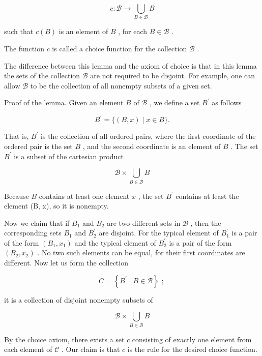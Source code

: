 \[
c : \mathcal{B} \rightarrow  \mathop{\bigcup }\limits_{{B \in  \mathcal{B}}}B
\]

such that \(c\left( B\right)\) is an element of \(B\) , for each \(B \in  \mathcal{B}\) .

The function \(c\) is called a choice function for the collection \(\mathcal{B}\) .

The difference between this lemma and the axiom of choice is that in this lemma the sets of the collection \(\mathcal{B}\) are not required to be disjoint. For example, one can allow \(\mathcal{B}\) to be the collection of all nonempty subsets of a given set.

Proof of the lemma. Given an element \(B\) of \(\mathcal{B}\) , we define a set \({B}^{\prime }\) as follows

\[
{B}^{\prime } = \{ \left( {B,x}\right)  \mid  x \in  B\} .
\]

That is, \({B}^{\prime }\) is the collection of all ordered pairs, where the first coordinate of the ordered pair is the set \(B\) , and the second coordinate is an element of \(B\) . The set \({B}^{\prime }\) is a subset of the cartesian product

\[
\mathcal{B} \times  \mathop{\bigcup }\limits_{{B \in  \mathcal{B}}}B
\]

Because \(B\) contains at least one element \(x\) , the set \({B}^{\prime }\) contains at least the element (B, x), so it is nonempty.

Now we claim that if \({B}_{1}\) and \({B}_{2}\) are two different sets in \(\mathcal{B}\) , then the corresponding sets \({B}_{1}^{\prime }\) and \({B}_{2}^{\prime }\) are disjoint. For the typical element of \({B}_{1}^{\prime }\) is a pair of the form \(\left( {{B}_{1},{x}_{1}}\right)\) and the typical element of \({B}_{2}^{\prime }\) is a pair of the form \(\left( {{B}_{2},{x}_{2}}\right)\) . No two such elements can be equal, for their first coordinates are different. Now let us form the collection

\[
C = \left\{  {{B}^{\prime } \mid  B \in  \mathcal{B}}\right\}  \text{ ; }
\]

it is a collection of disjoint nonempty subsets of

\[
\mathcal{B} \times  \mathop{\bigcup }\limits_{{B \in  \mathcal{B}}}B
\]

By the choice axiom, there exists a set \(c\) consisting of exactly one element from each element of \(\mathcal{C}\) . Our claim is that \(c\) is the rule for the desired choice function.

